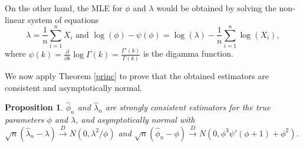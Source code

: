 \documentclass[10pt,a4paper,onecolumn]{article} %
\newtheorem{proposition}[theorem]{Proposition}
\begin{document}
On the other hand, the MLE for $\phi$ and $\lambda$ would be obtained by solving the non-linear system of equations
\begin{equation}\label{verogg23}
\lambda=\frac{1}{n}\sum_{i=1}^n X_i\mbox{ and }\log(\phi)-\psi(\phi)=\log(\lambda)-\frac{1}{n}\sum_{i=1}^n{\log\left(X_i\right)}, 
 \end{equation}
where $\psi(k)=\frac{\partial}{\partial k}\log\Gamma(k)=\frac{\Gamma'(k)}{\Gamma(k)}$ is the digamma function.

We now apply Theorem \ref{princ} to prove that the obtained estimators are consistent and asymptotically normal.

\begin{proposition}\label{proofgamma} $\hat\phi_n$ and $\hat\lambda_n$ are strongly consistent estimators for the true parameters $\phi$ and $\lambda$, and asymptotically normal with $\sqrt{n}\left(\hat{\lambda}_n-\lambda\right)\overset{D}{\to} N\left(0,\lambda^2/\phi\right)$ and $\sqrt{n}\left(\hat{\phi}_n-\phi\right)\overset{D}{\to} N\left(0,\phi^3\psi'(\phi+1)+\phi^2\right)$.
\end{proposition}
\end{document}
